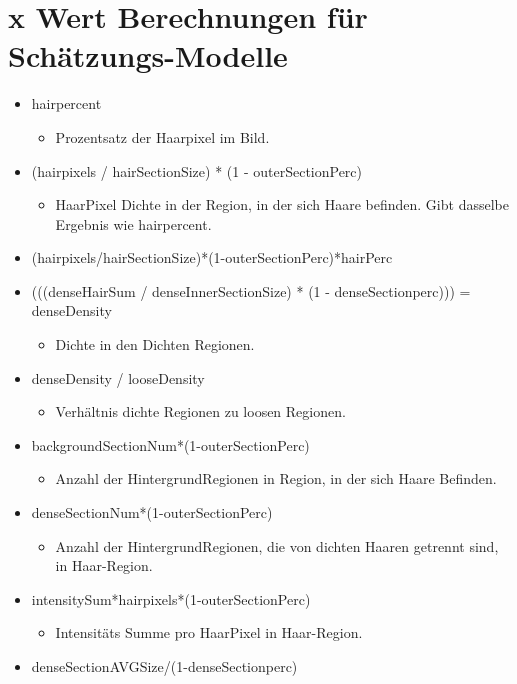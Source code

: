 \documentclass[german,a4paper, 12pt]{llncs}
\begin{document}
\section{x Wert Berechnungen für Schätzungs-Modelle}
\label{appendix:xwertemodel}
\begin{itemize}
	\item hairpercent 
	\begin{itemize}
		\item Prozentsatz der Haarpixel im Bild.
	\end{itemize}
	\item (hairpixels / hairSectionSize) * (1 - outerSectionPerc)
	\begin{itemize}
		\item HaarPixel Dichte in der Region, in der sich Haare befinden. Gibt dasselbe Ergebnis wie hairpercent.
	\end{itemize}
	\item (hairpixels/hairSectionSize)*(1-outerSectionPerc)*hairPerc
	\item (((denseHairSum / denseInnerSectionSize) * (1 - denseSectionperc))) = denseDensity
	\begin{itemize}
		\item Dichte in den Dichten Regionen.
	\end{itemize}
	\item denseDensity / looseDensity
	\begin{itemize}
		\item Verhältnis dichte Regionen zu loosen Regionen.
	\end{itemize}
	\item backgroundSectionNum*(1-outerSectionPerc)
		\begin{itemize}
		\item Anzahl der HintergrundRegionen in Region, in der sich Haare Befinden.
	\end{itemize}
	\item denseSectionNum*(1-outerSectionPerc)
		\begin{itemize}
		\item Anzahl der HintergrundRegionen, die von dichten Haaren getrennt sind, in Haar-Region.
	\end{itemize}
	\item intensitySum*hairpixels*(1-outerSectionPerc)
	\begin{itemize}
		\item Intensitäts Summe pro HaarPixel in Haar-Region.
	\end{itemize}
	\item denseSectionAVGSize/(1-denseSectionperc)

\end{itemize}
\end{document}
